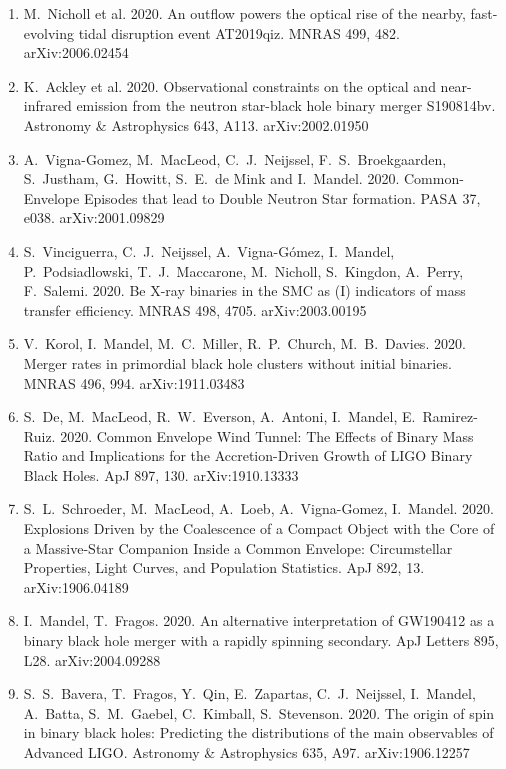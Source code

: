 \documentclass[margin,line]{res}
\begin{document}
\begin{resume}
\begin{enumerate}
\item M.~Nicholl et al. 2020. An outflow powers the optical rise of the nearby, fast-evolving tidal disruption event AT2019qiz. MNRAS 499, 482.  arXiv:2006.02454

\item K.~Ackley et al. 2020. Observational constraints on the optical and near-infrared emission from the neutron star-black hole binary merger S190814bv.  Astronomy \& Astrophysics 643, A113.
arXiv:2002.01950

\item A.~Vigna-Gomez, M.~MacLeod, C.~J.~Neijssel, F.~S.~Broekgaarden, S.~Justham, G.~Howitt, S.~E.~de Mink and I.~Mandel.  2020. Common-Envelope Episodes that lead to Double Neutron Star formation.  PASA 37, e038.  arXiv:2001.09829 

\item S.~Vinciguerra, C.~J.~Neijssel, A.~Vigna-G\'{o}mez, I.~Mandel, P.~Podsiadlowski, T.~J.~Maccarone, M.~Nicholl, S.~Kingdon, A.~Perry, F.~Salemi.  2020. Be X-ray binaries in the SMC as (I) indicators of mass transfer efficiency.  MNRAS 498, 4705.  arXiv:2003.00195

\item V.~Korol, I.~Mandel, M.~C.~Miller, R.~P.~Church, M.~B.~Davies. 2020. Merger rates in primordial black hole clusters without initial binaries. MNRAS 496, 994.  arXiv:1911.03483

\item S.~De, M.~MacLeod, R.~W.~Everson, A.~Antoni, I.~Mandel, E.~Ramirez-Ruiz.  2020.  Common Envelope Wind Tunnel: The Effects of Binary Mass Ratio and Implications for the Accretion-Driven Growth of LIGO Binary Black Holes.  ApJ 897, 130.  arXiv:1910.13333

\item S.~L.~Schroeder, M.~MacLeod, A.~Loeb, A.~Vigna-Gomez, I.~Mandel.  2020. Explosions Driven by the Coalescence of a Compact Object with the Core of a Massive-Star Companion Inside a Common Envelope: Circumstellar Properties, Light Curves, and Population Statistics.  ApJ 892, 13.  arXiv:1906.04189

\item I.~Mandel, T.~Fragos. 2020. An alternative interpretation of GW190412 as a binary black hole merger with a rapidly spinning secondary.  ApJ Letters 895, L28. arXiv:2004.09288

\item S.~S.~Bavera, T.~Fragos, Y.~Qin, E.~Zapartas, C.~J.~Neijssel, I.~Mandel, A.~Batta, S.~M.~Gaebel, C.~Kimball, S.~Stevenson.  2020.  The origin of spin in binary black holes: Predicting the distributions of the main observables of Advanced LIGO.  Astronomy \& Astrophysics 635, A97.  arXiv:1906.12257


\end{enumerate}
\end{resume}
\end{document}
